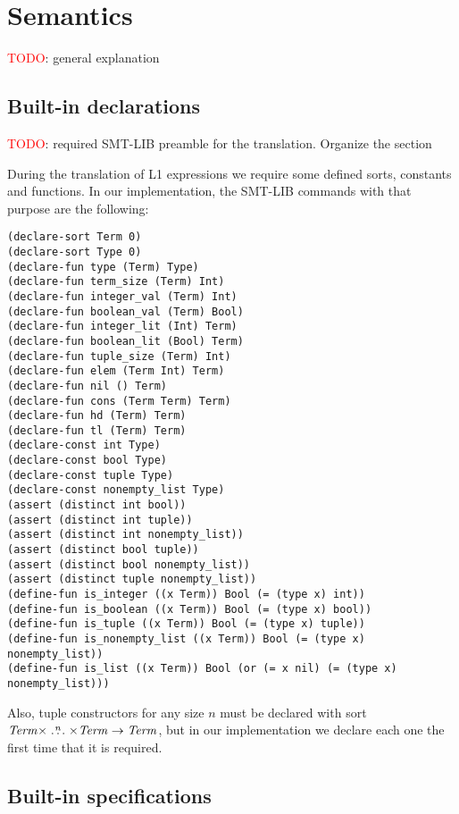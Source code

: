 \section{Semantics}

\textcolor{red}{TODO}: general explanation

\subsection{Built-in declarations}

\textcolor{red}{TODO}: required SMT-LIB preamble for the translation.
Organize the section

During the translation of L1 expressions we require some 
defined sorts, constants and functions. In our implementation,
the SMT-LIB commands with that purpose are the following:

\begin{verbatim}
(declare-sort Term 0)
(declare-sort Type 0)
(declare-fun type (Term) Type)
(declare-fun term_size (Term) Int)
(declare-fun integer_val (Term) Int)
(declare-fun boolean_val (Term) Bool)
(declare-fun integer_lit (Int) Term)
(declare-fun boolean_lit (Bool) Term)
(declare-fun tuple_size (Term) Int)
(declare-fun elem (Term Int) Term)
(declare-fun nil () Term)
(declare-fun cons (Term Term) Term)
(declare-fun hd (Term) Term)
(declare-fun tl (Term) Term)
(declare-const int Type)
(declare-const bool Type)
(declare-const tuple Type)
(declare-const nonempty_list Type)
(assert (distinct int bool))
(assert (distinct int tuple))
(assert (distinct int nonempty_list))
(assert (distinct bool tuple))
(assert (distinct bool nonempty_list))
(assert (distinct tuple nonempty_list))
(define-fun is_integer ((x Term)) Bool (= (type x) int))
(define-fun is_boolean ((x Term)) Bool (= (type x) bool))
(define-fun is_tuple ((x Term)) Bool (= (type x) tuple))
(define-fun is_nonempty_list ((x Term)) Bool (= (type x) nonempty_list))
(define-fun is_list ((x Term)) Bool (or (= x nil) (= (type x) nonempty_list)))
\end{verbatim}

Also, tuple constructors for any size $n$ must be declared with sort 
$\mathit{Term} \times \stackrel{n}{\dots} 
\times \mathit{Term} \rightarrow \mathit{Term}$, but 
in our implementation we declare each one the first time that it is required.

\subsection{Built-in specifications}

